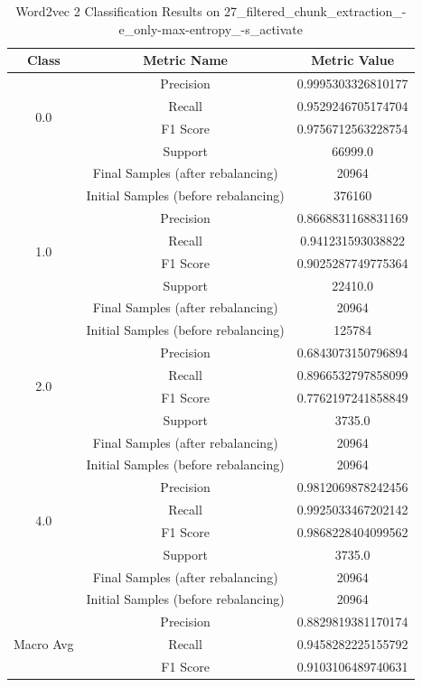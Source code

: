 \begin{longtable}{|c|c|c|}
\caption{Word2vec 2 Classification Results on 27\_filtered\_chunk\_extraction\_-e\_only-max-entropy\_-s\_activate} \label{tab:27_filtered_chunk_extraction_-e_only-max-entropy_-s_activate_word2vec_2_classifiers_results} \\
\hline
Class & Metric Name & Metric Value \\
\hline
\multirow{4}{*}{0.0} & Precision & 0.9995303326810177 \\
 & Recall & 0.9529246705174704 \\
 & F1 Score & 0.9756712563228754 \\
 & Support & 66999.0 \\
 & Final Samples (after rebalancing) & 20964 \\
 & Initial Samples (before rebalancing) & 376160 \\
\hline
\multirow{4}{*}{1.0} & Precision & 0.8668831168831169 \\
 & Recall & 0.941231593038822 \\
 & F1 Score & 0.9025287749775364 \\
 & Support & 22410.0 \\
 & Final Samples (after rebalancing) & 20964 \\
 & Initial Samples (before rebalancing) & 125784 \\
\hline
\multirow{4}{*}{2.0} & Precision & 0.6843073150796894 \\
 & Recall & 0.8966532797858099 \\
 & F1 Score & 0.7762197241858849 \\
 & Support & 3735.0 \\
 & Final Samples (after rebalancing) & 20964 \\
 & Initial Samples (before rebalancing) & 20964 \\
\hline
\multirow{4}{*}{4.0} & Precision & 0.9812069878242456 \\
 & Recall & 0.9925033467202142 \\
 & F1 Score & 0.9868228404099562 \\
 & Support & 3735.0 \\
 & Final Samples (after rebalancing) & 20964 \\
 & Initial Samples (before rebalancing) & 20964 \\
\hline
\multirow{4}{*}{Macro Avg} & Precision & 0.8829819381170174 \\
 & Recall & 0.9458282225155792 \\
 & F1 Score & 0.9103106489740631 \\

\end{longtable}
